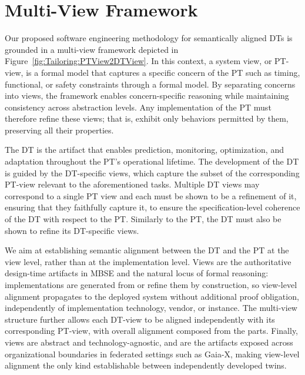 


\section{Multi-View Framework}\label{sec:architecture}

Our proposed software engineering methodology for semantically aligned DTs is grounded in a multi-view framework depicted in Figure~\ref{fig:Tailoring:PTView2DTView}. In this context, a system view, or PT-view, is a formal model that captures a specific concern of the PT such as timing, functional, or safety constraints through a formal model. By separating concerns into views, the framework enables concern-specific reasoning while maintaining consistency across abstraction levels. Any implementation of the PT must therefore refine these views; that is, exhibit only behaviors permitted by them, preserving all their properties.

The DT is the artifact that enables prediction, monitoring, optimization, and adaptation throughout the PT's operational lifetime. The development of the DT is guided by the DT-specific views, which capture the subset of the corresponding PT-view relevant to the aforementioned tasks. Multiple DT views may correspond to a single PT view and each must be shown to be a refinement of it, ensuring that they faithfully capture it, to ensure the specification-level coherence of the DT with respect to the PT. Similarly to the PT, the DT must also be shown to refine its DT-specific views.


We aim at establishing semantic alignment between the DT and the PT at the view level, rather than at the implementation level.  Views are the authoritative design-time artifacts in MBSE and the natural locus of formal reasoning: implementations are generated from or refine them by construction, so view-level alignment propagates to the deployed system without additional proof obligation, independently of implementation technology, vendor, or instance. The multi-view structure further allows each DT-view to be aligned independently with its corresponding PT-view, with overall alignment composed from the parts. Finally, views are abstract and technology-agnostic, and are the artifacts exposed across organizational boundaries in federated settings such as Gaia-X, making view-level alignment the only kind establishable between independently developed twins.

